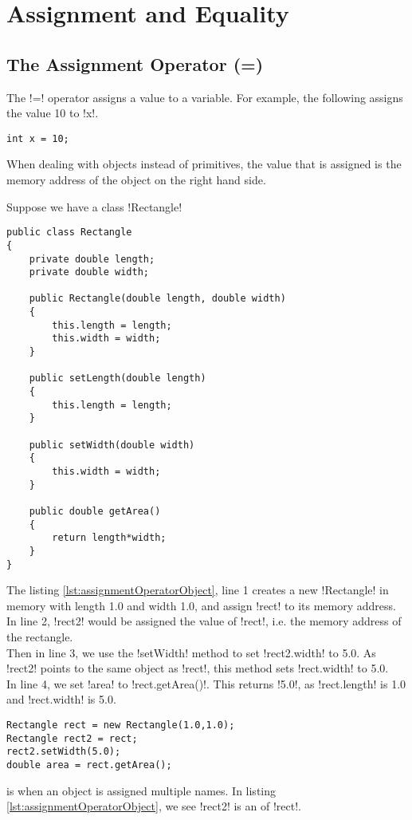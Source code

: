 \documentclass[11pt]{article}
\begin{document}
\section{Assignment and Equality}
\subsection{The Assignment Operator (=)}
The \inline!=! operator assigns a value to a variable. For example, the following assigns the value 10 to \inline!x!.
\vspace{-15pt}
\begin{lstlisting}
int x = 10;
\end{lstlisting}
When dealing with objects instead of primitives, the value that is assigned is the memory address of the object on the right hand side.
\begin{eg} Suppose we have a class \inline!Rectangle!
\begin{lstlisting}[caption=Rectangle, label=lst:Rectangle]
public class Rectangle
{
    private double length;
    private double width;

    public Rectangle(double length, double width)
    {
        this.length = length;
        this.width = width;
    }

    public setLength(double length)
    {
        this.length = length;
    }

    public setWidth(double width)
    {
        this.width = width;
    }
    
    public double getArea()
    {
        return length*width;
    }
}
\end{lstlisting}
\pagebreak
The listing \ref{lst:assignmentOperatorObject}, line 1 creates a new \inline!Rectangle! in memory with length 1.0 and width 1.0, and assign \inline!rect! to its memory address.
\\ In line 2, \inline!rect2! would be assigned the value of \inline!rect!, i.e. the memory address of the rectangle.
\\ Then in line 3, we use the \inline!setWidth! method to set \inline!rect2.width! to 5.0. As \inline!rect2! points to the same object as \inline!rect!, this method sets \inline!rect.width! to 5.0.
\\ In line 4, we set \inline!area! to \inline!rect.getArea()!. This returns \inline!5.0!, as \inline!rect.length! is 1.0 and \inline!rect.width! is 5.0.
\begin{lstlisting}[caption=A sample of code to interact with the Rectangle class, label=lst:assignmentOperatorObject] 
Rectangle rect = new Rectangle(1.0,1.0);
Rectangle rect2 = rect;
rect2.setWidth(5.0);
double area = rect.getArea();
\end{lstlisting}
\end{eg}
\begin{defi}[Aliasing]
 is when an object is assigned multiple names. In listing \ref{lst:assignmentOperatorObject}, we see \inline!rect2! is an  of \inline!rect!.
\end{defi}
\end{document}
